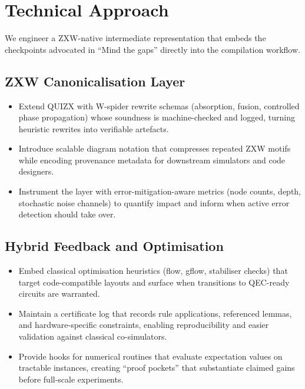 \section{Technical Approach}
We engineer a ZXW-native intermediate representation that embeds the checkpoints advocated in ``Mind the gaps'' directly into the compilation workflow.

\subsection{ZXW Canonicalisation Layer}
\begin{itemize}
  \item Extend QUIZX with W-spider rewrite schemas (absorption, fusion, controlled phase propagation) whose soundness is machine-checked and logged, turning heuristic rewrites into verifiable artefacts.
  \item Introduce scalable diagram notation that compresses repeated ZXW motifs while encoding provenance metadata for downstream simulators and code designers.
  \item Instrument the layer with error-mitigation-aware metrics (node counts, depth, stochastic noise channels) to quantify impact and inform when active error detection should take over.
\end{itemize}

\subsection{Hybrid Feedback and Optimisation}
\begin{itemize}
  \item Embed classical optimisation heuristics (flow, gflow, stabiliser checks) that target code-compatible layouts and surface when transitions to QEC-ready circuits are warranted.
  \item Maintain a certificate log that records rule applications, referenced lemmas, and hardware-specific constraints, enabling reproducibility and easier validation against classical co-simulators.
  \item Provide hooks for numerical routines that evaluate expectation values on tractable instances, creating ``proof pockets'' that substantiate claimed gains before full-scale experiments.
\end{itemize}

